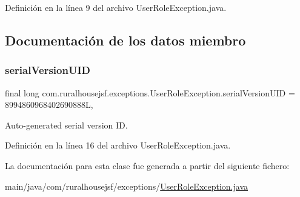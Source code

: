Definición en la línea 9 del archivo User\+Role\+Exception.\+java.



\subsection{Documentación de los datos miembro}
\mbox{\label{a00216_a9894bada17e7192af3bfcdd028fd6c57}} 
\subsubsection{\texorpdfstring{serialVersionUID}{serialVersionUID}}
{\footnotesize\ttfamily final long com.\+ruralhousejsf.\+exceptions.\+User\+Role\+Exception.\+serial\+Version\+U\+ID = 8994860968402690888L\hspace{0.3cm}{\ttfamily [static]}, {\ttfamily [private]}}



Auto-\/generated serial version ID. 



Definición en la línea 16 del archivo User\+Role\+Exception.\+java.



La documentación para esta clase fue generada a partir del siguiente fichero\+:\begin{DoxyCompactItemize}
\item 
main/java/com/ruralhousejsf/exceptions/\mbox{\hyperlink{a00068}{User\+Role\+Exception.\+java}}\end{DoxyCompactItemize}
